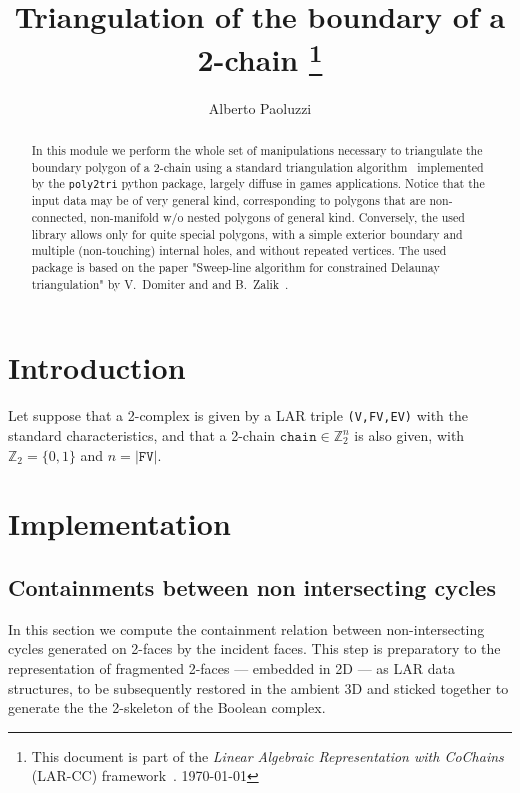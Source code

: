 \documentclass[11pt,oneside]{article}	%
\title{Triangulation of the boundary of a 2-chain
\footnote{This document is part of the \emph{Linear Algebraic Representation with CoChains} (LAR-CC) framework~\cite{cclar-proj:2013:00}. \today}
}
\author{Alberto Paoluzzi}
\def\Z{\mathbb{Z}}
\begin{document}
\maketitle
\nonstopmode

\begin{abstract}
In this module we perform the whole set of manipulations necessary to triangulate the boundary polygon of a 2-chain using a standard triangulation algorithm~\cite{} implemented by the \texttt{poly2tri} python package, largely diffuse in games applications.
Notice that the input data may be of very general kind, corresponding to polygons that are non-connected, non-manifold w/o nested polygons of general kind. Conversely, the used library allows only for quite special polygons, with a simple exterior boundary and multiple (non-touching) internal holes, and without repeated vertices. The used package is based on the paper "Sweep-line algorithm for constrained Delaunay triangulation" by V.~Domiter and and B.~Zalik~\cite{poly2tri:2008}.
\end{abstract}

\tableofcontents


\section{Introduction}

Let suppose that a  2-complex is given by a LAR triple \texttt{(V,FV,EV)} with the standard characteristics, and that a 2-chain $\texttt{chain}\in\Z_2^n$ is also given, with $\Z_2=\{0,1\}$ and $n = |\texttt{FV}|$.





\section{Implementation}


\subsection{Containments between non intersecting cycles}

In this section we compute the containment relation between non-intersecting cycles generated on 2-faces by the incident faces. This step is preparatory to the representation of fragmented 2-faces --- embedded in 2D --- as LAR data structures, to be subsequently restored in the ambient 3D and sticked together to generate the the 2-skeleton of the Boolean complex.
\end{document}
